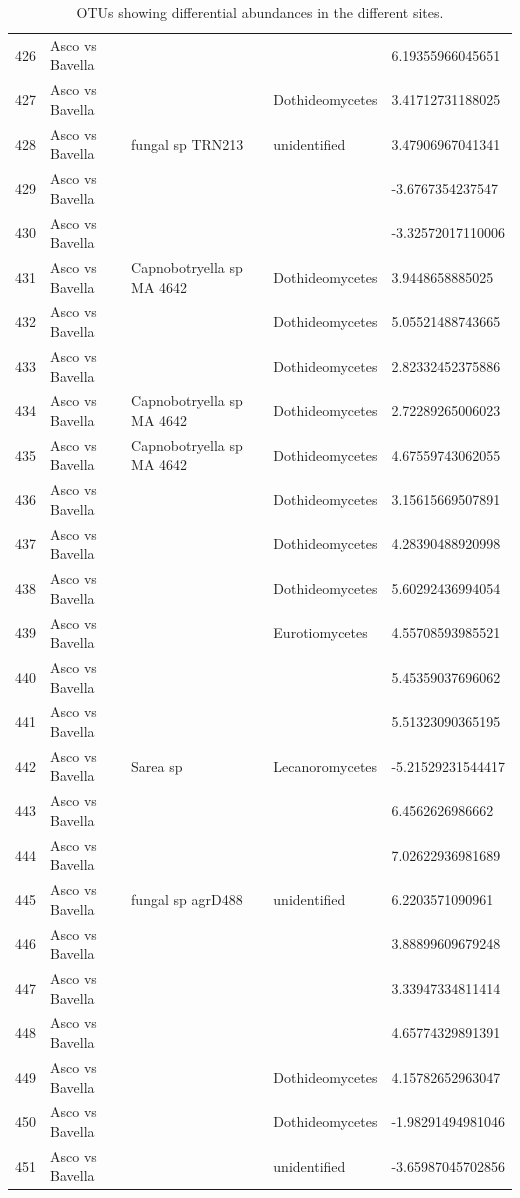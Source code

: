 \documentclass[12pt]{article}\usepackage[]{graphicx}\usepackage[]{color}
\numberwithin{figure}{section}
\begin{document}
\begin{table}[ht]
\begin{tabular}{lllll}
  426 & Asco vs Bavella &  &  & 6.19355966045651 \\ 
  427 & Asco vs Bavella &  & Dothideomycetes & 3.41712731188025 \\ 
  428 & Asco vs Bavella & fungal sp TRN213 & unidentified & 3.47906967041341 \\ 
  429 & Asco vs Bavella &  &  & -3.6767354237547 \\ 
  430 & Asco vs Bavella &  &  & -3.32572017110006 \\ 
  431 & Asco vs Bavella & Capnobotryella sp MA 4642 & Dothideomycetes & 3.9448658885025 \\ 
  432 & Asco vs Bavella &  & Dothideomycetes & 5.05521488743665 \\ 
  433 & Asco vs Bavella &  & Dothideomycetes & 2.82332452375886 \\ 
  434 & Asco vs Bavella & Capnobotryella sp MA 4642 & Dothideomycetes & 2.72289265006023 \\ 
  435 & Asco vs Bavella & Capnobotryella sp MA 4642 & Dothideomycetes & 4.67559743062055 \\ 
  436 & Asco vs Bavella &  & Dothideomycetes & 3.15615669507891 \\ 
  437 & Asco vs Bavella &  & Dothideomycetes & 4.28390488920998 \\ 
  438 & Asco vs Bavella &  & Dothideomycetes & 5.60292436994054 \\ 
  439 & Asco vs Bavella &  & Eurotiomycetes & 4.55708593985521 \\ 
  440 & Asco vs Bavella &  &  & 5.45359037696062 \\ 
  441 & Asco vs Bavella &  &  & 5.51323090365195 \\ 
  442 & Asco vs Bavella & Sarea sp & Lecanoromycetes & -5.21529231544417 \\ 
  443 & Asco vs Bavella &  &  & 6.4562626986662 \\ 
  444 & Asco vs Bavella &  &  & 7.02622936981689 \\ 
  445 & Asco vs Bavella & fungal sp agrD488 & unidentified & 6.2203571090961 \\ 
  446 & Asco vs Bavella &  &  & 3.88899609679248 \\ 
  447 & Asco vs Bavella &  &  & 3.33947334811414 \\ 
  448 & Asco vs Bavella &  &  & 4.65774329891391 \\ 
  449 & Asco vs Bavella &  & Dothideomycetes & 4.15782652963047 \\ 
  450 & Asco vs Bavella &  & Dothideomycetes & -1.98291494981046 \\ 
  451 & Asco vs Bavella &  & unidentified & -3.65987045702856 \\ 
   \hline
\end{tabular}
\endgroup
\caption{OTUs showing differential abundances in the different sites.} 
\end{table}
\end{document}

